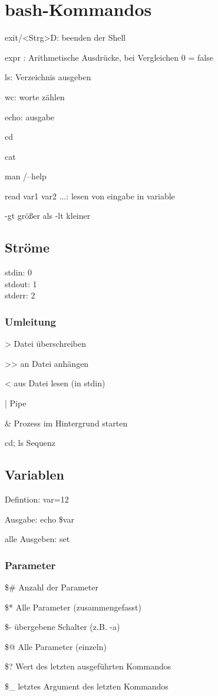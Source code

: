  \section*{bash-Kommandos}
exit/<Strg>D: beenden der Shell

expr : Arithmetische Ausdrücke, bei Vergleichen 0 = false

ls: Verzeichnis ausgeben

wc: worte zählen

echo: ausgabe

cd

cat

man /--help

read var1 var2 ...:  lesen von eingabe in variable

-gt größer als
-lt kleiner 

\subsection*{Ströme}
stdin: 0\\
stdout: 1\\
stderr: 2\\
\subsubsection*{Umleitung}
> Datei überschreiben

>> an Datei anhängen

< aus Datei lesen (in stdin)

| Pipe

\& Prozess im Hintergrund starten

cd; ls  Sequenz
\subsection*{Variablen}
Defintion:  var=12

Ausgabe:    echo \$var

alle Ausgeben:  set
\subsubsection*{Parameter}
\$\# Anzahl der Parameter

\$* Alle Parameter (zusammengefasst)

\$- übergebene Schalter (z.B. -a)

\$@ Alle Parameter (einzeln)

\$? Wert des letzten ausgeführten Kommandos

\$\_ letztes Argument des letzten Kommandos

